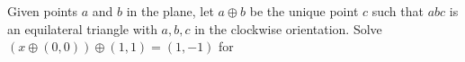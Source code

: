 Given points $a$ and $b$ in the plane, let $a\oplus b$ be the unique point $c$ such that $abc$ is an equilateral triangle with $a,b,c$ in the clockwise orientation.
Solve $(x\oplus (0,0))\oplus(1,1)=(1,-1)$ for 